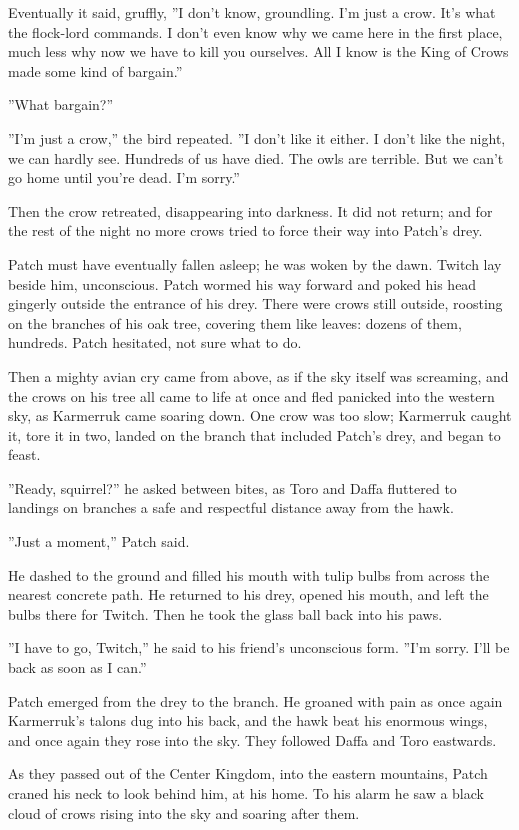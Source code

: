 \documentclass[12pt]{book}
\begin{document}
Eventually it said, gruffly, ''I don't know, groundling. I'm just a
crow. It's what the flock-lord commands. I don't even know why we came
here in the first place, much less why now we have to kill you
ourselves. All I know is the King of Crows made some kind of
bargain.''

''What bargain?''

''I'm just a crow,'' the bird repeated. ''I don't like it either. I
don't like the night, we can hardly see. Hundreds of us have died. The
owls are terrible. But we can't go home until you're dead. I'm
sorry.''

Then the crow retreated, disappearing into darkness. It did not
return; and for the rest of the night no more crows tried to force
their way into Patch's drey.

Patch must have eventually fallen asleep; he was woken by the
dawn. Twitch lay beside him, unconscious. Patch wormed his way forward
and poked his head gingerly outside the entrance of his drey. There
were crows still outside, roosting on the branches of his oak tree,
covering them like leaves: dozens of them, hundreds. Patch hesitated,
not sure what to do.

Then a mighty avian cry came from above, as if the sky itself was
screaming, and the crows on his tree all came to life at once and fled
panicked into the western sky, as Karmerruk came soaring down. One
crow was too slow; Karmerruk caught it, tore it in two, landed on the
branch that included Patch's drey, and began to feast.

''Ready, squirrel?'' he asked between bites, as Toro and Daffa
fluttered to landings on branches a safe and respectful distance away
from the hawk.

''Just a moment,'' Patch said.

He dashed to the ground and filled his mouth with tulip bulbs from
across the nearest concrete path. He returned to his drey, opened his
mouth, and left the bulbs there for Twitch. Then he took the glass
ball back into his paws.

''I have to go, Twitch,'' he said to his friend's unconscious
form. ''I'm sorry. I'll be back as soon as I can.''

Patch emerged from the drey to the branch. He groaned with pain as
once again Karmerruk's talons dug into his back, and the hawk beat his
enormous wings, and once again they rose into the sky. They followed
Daffa and Toro eastwards.

As they passed out of the Center Kingdom, into the eastern mountains,
Patch craned his neck to look behind him, at his home. To his alarm he
saw a black cloud of crows rising into the sky and soaring after them.
\end{document}
